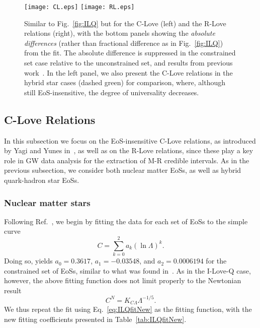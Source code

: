 \documentclass[prd,twocolumn,nofootinbib,superscriptaddress,amsmath,amssymb]{revtex4-1}
\begin{document}

\begin{figure*}
\begin{center} 
\texttt{[image: CL.eps]}
\texttt{[image: RL.eps]}
\end{center}
\caption{
Similar to Fig.~\ref{fig:ILQ} but for the C-Love (left) and the R-Love relations (right), with the bottom panels showing the \emph{absolute differences} (rather than fractional difference as in Fig.~\ref{fig:ILQ}) from the fit. The absolute difference is suppressed in the constrained set case relative to the unconstrained set, and results from previous work~\cite{Yagi:binLove}. In the left panel, we also present the C-Love relations in the hybrid star cases (dashed green) for comparison, where, although still EoS-insensitive, the degree of universality decreases.
}
\label{fig:clove}
\end{figure*} 

\subsection{C-Love Relations}
\label{sec:clove}

In this subsection we focus on the EoS-insensitive C-Love relations, as introduced by Yagi and Yunes in~\cite{Yagi:binLove}, as well as on the R-Love relations, since these play a key role in GW data analysis for the extraction of M-R credible intervals. As in the previous subsection, we consider both nuclear matter EoSs, as well as hybrid quark-hadron star EoSs.

\subsubsection{Nuclear matter stars}
\label{sec:clove-nuc}

Following Ref.~\cite{Yagi:binLove}, we begin by fitting the data for each set of EoSs to the simple curve
\begin{equation}
C = \sum^2_{k=0} a_k (\ln{\Lambda})^k.
\end{equation}
Doing so, yields $a_0 = 0.3617$, $a_1 = -0.03548$, and $a_2 = 0.0006194$ for the constrained set of EoSs, similar to what was found in~\cite{Yagi:binLove}. As in the I-Love-Q case, however, the above fitting function does not limit properly to the Newtonian result 
\begin{equation}
C^N=K_{C\Lambda}\Lambda^{-1/5}.\label{eq:cloveFit}
\end{equation}
We thus repeat the fit using Eq.~\ref{eq:ILQfitNew} as the fitting function, with the new fitting coefficients presented in Table~\ref{tab:ILQfitNew}.
\end{document}
